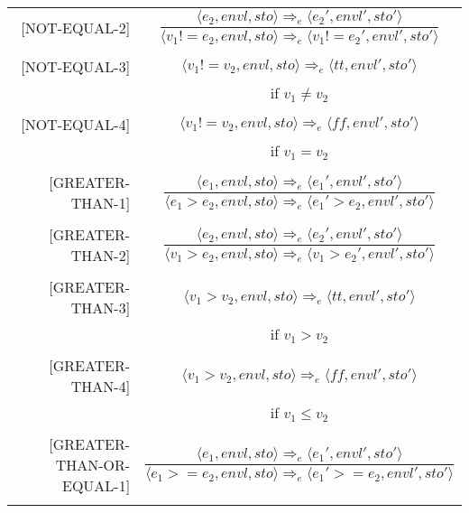 \begin{longtable}[c] { r c }
  [NOT-EQUAL-2] & \( 
    \dfrac { \langle e_2, envl, sto \rangle \Rightarrow_e \langle e_2', envl', sto' \rangle }
      { \langle v_1 != e_2, envl, sto \rangle \Rightarrow_e \langle v_1 != e_2', envl', sto' \rangle } \)
  \\
  & \\

  [NOT-EQUAL-3] & \( 
    \langle v_1 != v_2, envl, sto \rangle \Rightarrow_e \langle tt, envl', sto' \rangle \)
  \\
  & if \( v_1 \neq v_2 \) \\
  & \\

  [NOT-EQUAL-4] & \( 
    \langle v_1 != v_2, envl, sto \rangle \Rightarrow_e \langle ff, envl', sto' \rangle \)
  \\
  & if \( v_1 = v_2 \) \\
  & \\

  [GREATER-THAN-1] & \( 
    \dfrac { \langle e_1, envl, sto \rangle \Rightarrow_e \langle e_1', envl', sto' \rangle }
      { \langle e_1 > e_2, envl, sto \rangle \Rightarrow_e \langle e_1' > e_2, envl', sto' \rangle } \)
  \\
  & \\

  [GREATER-THAN-2] & \( 
    \dfrac { \langle e_2, envl, sto \rangle \Rightarrow_e \langle e_2', envl', sto' \rangle }
      { \langle v_1 > e_2, envl, sto \rangle \Rightarrow_e \langle v_1 > e_2', envl', sto' \rangle } \)
  \\
  & \\

  [GREATER-THAN-3] & \( 
    \langle v_1 > v_2, envl, sto \rangle \Rightarrow_e \langle tt, envl', sto' \rangle \)
  \\
  & if \( v_1 > v_2 \) \\
  & \\

  [GREATER-THAN-4] & \( 
    \langle v_1 > v_2, envl, sto \rangle \Rightarrow_e \langle ff, envl', sto' \rangle \)
  \\
  & if \( v_1 \leq v_2 \) \\
  & \\

  [GREATER-THAN-OR-EQUAL-1] & \( 
    \dfrac { \langle e_1, envl, sto \rangle \Rightarrow_e \langle e_1', envl', sto' \rangle }
      { \langle e_1 > = e_2, envl, sto \rangle \Rightarrow_e \langle e_1' > = e_2, envl', sto' \rangle } \)
  \\
  & \\


\end{longtable}
